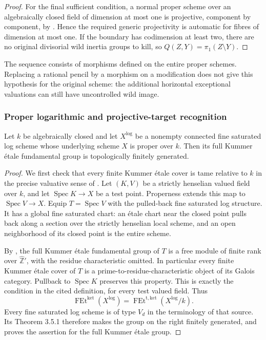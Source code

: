 \begin{proof}
For the final sufficient condition, a normal proper scheme
over an algebraically closed field of dimension at most one
is projective, component by component, by
\cite[Lemma 33.43.4, section 0A22]{C_StacksLogFibration}.
Hence the required
generic projectivity is automatic for fibres of dimension
at most one.  If the boundary has codimension at least two,
there are no original divisorial wild inertia groups to kill,
so $Q(Z,Y)=\pi_1(Z\setminus Y)$.
\end{proof}

\begin{remark}
The sequence consists of morphisms defined on the entire
proper schemes.  Replacing a rational pencil by a morphism
on a modification does not give this hypothesis for the
original scheme: the additional horizontal exceptional
valuations can still have uncontrolled wild image.
\end{remark}

\subsubsection{Proper logarithmic and projective-target recognition}

\begin{lemma}
\label{D:proper-log-finite-generation}
Let $k$ be algebraically closed and let $X^{\log}$ be a nonempty
connected fine saturated log scheme whose underlying scheme $X$
is proper over $k$.  Then its full Kummer \'etale fundamental
group is topologically finitely generated.
\end{lemma}
\begin{proof}
We first check that every finite Kummer \'etale cover is tame
relative to $k$ in the precise valuative sense of
\cite[Definition 3.2.4]{AHLS2026}.  Let $(K,V)$ be a strictly
henselian valued field over $k$, and let
$\operatorname{Spec}K\to X$ be a test point.  Properness extends
this map to $\operatorname{Spec}V\to X$.  Equip
$T=\operatorname{Spec}V$ with the pulled-back fine saturated
log structure.  It has a global fine saturated chart: an
\'etale chart near the closed point pulls back along a section
over the strictly henselian local scheme, and an open
neighborhood of its closed point is the entire scheme.

By \cite[Proposition 3.1.8]{AHLS2026}, the full Kummer \'etale
fundamental group of $T$ is a free module of finite rank over
$\widehat{\mathbb Z}'$, with the residue characteristic omitted.
In particular every finite Kummer \'etale cover of $T$ is a
prime-to-residue-characteristic object of its Galois category.
Pullback to $\operatorname{Spec}K$ preserves this property.
This is exactly the condition in the cited definition, for
every test valued field.  Thus
\[
 \operatorname{FEt}^{\mathrm{ket}}(X^{\log})
   =\operatorname{FEt}^{\mathrm{t,ket}}(X^{\log}/k).
\]
Every fine saturated log scheme is of type $V_d$ in the
terminology of that source.  Its Theorem 3.5.1 therefore makes
the group on the right finitely generated, and proves the
assertion for the full Kummer \'etale group.
\end{proof}

